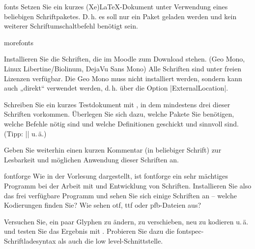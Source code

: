 \documentclass[
	solution,
	blatt=2,
	ausgabe=23.\,04.\,2010,
	rückgabe=30.\,04.\,2010
]{lcourse-hd}
\begin{document}
\begin{exercise}[name=Erste Schritte mit Schriften,punkte=3,abgabe = Quelltext per Mail{,} das fertige Dokument als Ausdruck.]{fonts}
Setzen Sie ein kurzes (Xe)\LaTeX-Dokument unter Verwendung eines beliebigen Schriftpaketes. D.\,h. es soll nur ein Paket geladen werden und kein weiterer Schriftumschaltbefehl benötigt sein.
\end{exercise}

\begin{exercise}[name=Die nächsten Schriftschritte,punkte=7,abgabe = Quelltext per Mail{,} das fertige Dokument als Ausdruck.]{morefonts}

Installieren Sie die Schriften, die im Moodle zum Download stehen. (Geo Mono, Linux Libertine/Biolinum, DejaVu Sans Mono) Alle Schriften sind unter freien Lizenzen verfügbar. Die Geo Mono muss nicht installiert werden, sondern kann auch „direkt“ verwendet werden, d.\,h. über die Option |ExternalLocation|.

Schreiben Sie ein kurzes Testdokument mit \XeLaTeX, in dem mindestens drei dieser Schriften vorkommen. Überlegen Sie sich dazu, welche Pakete Sie benötigen, welche Befehle nötig sind und welche Definitionen geschickt und sinnvoll sind. (Tipp: |\setmainfont| u.\,ä.)

Geben Sie weiterhin einen kurzen Kommentar (in beliebiger Schrift) zur Lesbarkeit und möglichen Anwendung dieser Schriften an.
\end{exercise}

\begin{expertexercise}[
	name=fontforge,
	abgabe = Keine Abgabe nötig.
]{fontforge}
Wie in der Vorlesung dargestellt, ist fontforge ein sehr mächtiges Programm bei der Arbeit mit und Entwicklung von Schriften. Installieren Sie also das frei verfügbare Programm und sehen Sie sich einige Schriften an – welche Kodierungen finden Sie? Wie sehen otf, ttf oder pfb-Dateien aus?

Versuchen Sie, ein paar Glyphen zu ändern, zu verschieben, neu zu kodieren u.\,ä. und testen Sie das Ergebnis mit \XeLaTeX. Probieren Sie dazu die fontspec-Schriftladesyntax als auch die low level-Schnittstelle.
\end{expertexercise}
\end{document}

